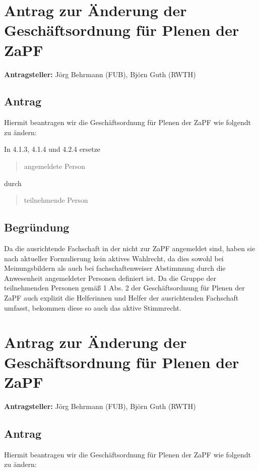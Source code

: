\documentclass[draft,10pt,oneside]{scrartcl}
\begin{document}
\section*{Antrag zur Änderung der Geschäftsordnung für Plenen der ZaPF}

\textbf{Antragsteller:} Jörg Behrmann (FUB), Björn Guth (RWTH)

\subsection*{Antrag}

Hiermit beantragen wir die Geschäftsordnung für Plenen der ZaPF wie folgendt zu
ändern:

In 4.1.3, 4.1.4 und 4.2.4 ersetze
\begin{quote}
	angemeldete Person
\end{quote}
durch
\begin{quote}
	teilnehmende Person
\end{quote}

\subsection*{Begründung}
Da die ausrichtende Fachschaft in der nicht zur ZaPF angemeldet sind, haben sie
nach aktueller Formulierung kein aktives Wahlrecht, da dies sowohl bei
Meinungsbildern als auch bei fachschaftenweiser Abstimmung durch die
Anwesenheit angemeldeter Personen definiert ist. Da die Gruppe der
teilnehmenden Personen gemäß 1 Abs. 2 der Geschäftsordnung für Plenen der ZaPF
auch explizit die Helferinnen und Helfer der ausrichtenden Fachschaft umfasst,
bekommen diese so auch das aktive Stimmrecht.

\newpage

\section*{Antrag zur Änderung der Geschäftsordnung für Plenen der ZaPF}

\textbf{Antragsteller:} Jörg Behrmann (FUB), Björn Guth (RWTH)

\subsection*{Antrag}

Hiermit beantragen wir die Geschäftsordnung für Plenen der ZaPF wie folgendt zu
ändern:
\end{document}

